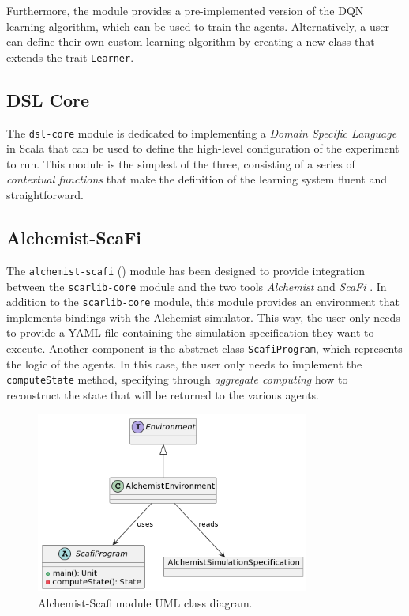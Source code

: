\documentclass[12pt,a4paper,openright,twoside]{book}
\begin{document}
Furthermore, the module provides a pre-implemented version of the DQN \cite{dqn} learning algorithm, which can be used 
    to train the agents. Alternatively, a user can define their own custom learning algorithm by creating a
    new class that extends the trait \texttt{Learner}.

\subsection*{DSL Core}
The \texttt{dsl-core} module is dedicated to implementing a \emph{Domain Specific Language} in Scala that can be used to 
    define the high-level configuration of the experiment to run. This module is the simplest of the three, 
    consisting of a series of \emph{contextual functions} that make the definition of the learning system 
    fluent and straightforward.

\subsection*{Alchemist-ScaFi}

The \texttt{alchemist-scafi} () module has been designed to provide integration between the \texttt{scarlib-core} module 
    and the two tools \emph{Alchemist} \cite{alchemist} and \emph{ScaFi} \cite{casadei2022scafi}. 
    In addition to the \texttt{scarlib-core} module, this module provides an environment that implements bindings 
    with the Alchemist simulator. This way, the user only needs to provide a YAML file containing the 
    simulation specification they want to execute. 
    Another component is the abstract class \texttt{ScafiProgram}, which represents the logic of the agents. 
    In this case, the user only needs to implement the \texttt{computeState} method, specifying through \emph{aggregate 
    computing} how to reconstruct the state that will be returned to the various agents.

\begin{figure}[t]
    \centering
    \includegraphics[width=0.8\textwidth]{figures/alchemist-scafi-uml.png}
    \caption{Alchemist-Scafi module UML class diagram.}
    \label{fig:alchemist-scafi}
\end{figure}
\end{document}
